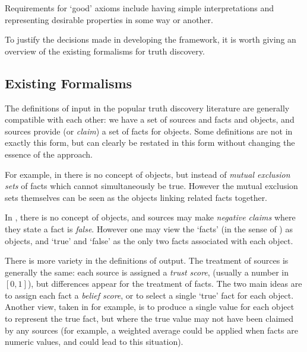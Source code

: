 \documentclass[../main.tex]{subfiles}
\begin{document}
Requirements for `good' axioms include having simple interpretations and
representing desirable properties in some way or another.

To justify the decisions made in developing the framework, it is worth giving
an overview of the existing formalisms for truth discovery.

\subsection{Existing Formalisms}

The definitions of input in the popular truth discovery literature
\cite{li_survey, gupta_han_survey, pasternack, galland, zhang_qi_tang} are
generally compatible with each other: we have a set of sources and facts and
objects\footnotemark, and sources provide (or \emph{claim}) a set of facts for
objects. Some definitions are not in exactly this form, but can clearly be
restated in this form without changing the essence of the approach.


For example, in \cite{pasternack} there is no concept of objects, but instead
of \emph{mutual exclusion sets} of facts which cannot simultaneously be true.
However the mutual exclusion sets themselves can be seen as the objects linking
related facts together.

In \cite{galland}, there is no concept of objects, and sources may make
\emph{negative claims} where they state a fact is \emph{false}. However one may
view the `facts' (in the sense of \cite{galland}) as objects, and `true' and
`false' as the only two facts associated with each object.

There is more variety in the definitions of output. The treatment of sources is
generally the same: each source is assigned a \emph{trust score}, (usually a
number in $[0, 1]$), but differences appear for the treatment of facts. The two
main ideas are to assign each fact a \emph{belief score}, or to select a single
`true' fact for each object. Another view, taken in \cite{li_conflicts} for
example, is to produce a single value for each object to represent the true
fact, but where the true value may not have been claimed by any sources (for
example, a weighted average could be applied when facts are numeric values, and
could lead to this situation).
\end{document}
